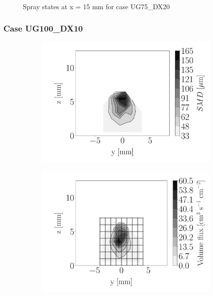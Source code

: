 \begin{figure}[h!]
\begin{subfigure}[b]{0.3\textwidth}
\end{subfigure}
\caption{Spray states at x = 15 mm for case UG75\_DX20}
\label{fig:injectors_sli_uG75_dx20_x15}
\end{figure}


\clearpage

\subsubsection*{Case UG100\_DX10}





\begin{figure}[h!]
\centering
\begin{subfigure}[b]{0.3\textwidth}
	\centering
   \includegraphics[scale=\scaleSLIJICF]{./part2_developments/figures_ch5_resolved_JICF/injectors_SLI/uG100_dx10_x05_SMD_map}
\end{subfigure}
   \hspace{0.17in}
\begin{subfigure}[b]{0.3\textwidth}
	\centering
   \includegraphics[scale=\scaleSLIJICF]{./part2_developments/figures_ch5_resolved_JICF/injectors_SLI/uG100_dx10_x05_volume_flux_map}

\end{subfigure}
\end{figure}

